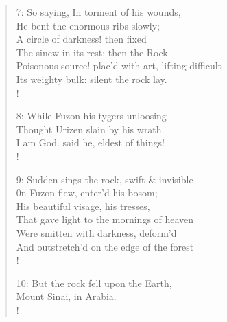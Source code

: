 \documentclass[9pt]{extarticle}
\begin{document}
\begin{verse}
\begin{altverse}
		7: So saying, In torment of his wounds,\\
		He bent the enormous ribs slowly;\\
		A circle of darkness! then fixed\\
		The sinew in its rest: then the Rock\\
		Poisonous source! plac’d with art, lifting difficult\\
		Its weighty bulk: silent the rock lay.\\!
		
		8: While Fuzon his tygers unloosing\\
		Thought Urizen slain by his wrath.\\
		I am God. said he, eldest of things!\\!
		
		9: Sudden sings the rock, swift \& invisible\\
		0n Fuzon flew, enter’d his bosom;\\
		His beautiful visage, his tresses,\\
		That gave light to the mornings of heaven\\
		Were smitten with darkness, deform’d\\
		And outstretch’d on the edge of the forest\\!
		
		10: But the rock fell upon the Earth,\\
		Mount Sinai, in Arabia.\\!
		
\end{altverse}
\end{verse}	
\end{document}
